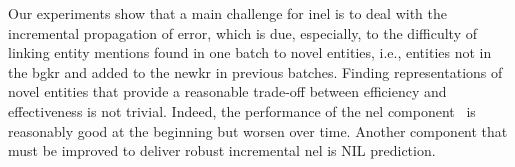 Our experiments show that a main challenge for \ac{inel} is to deal with the incremental propagation of error, which is due, especially, to the difficulty of linking entity mentions found in one batch to novel entities, i.e., entities not in the \ac{bgkr} and added to the \ac{newkr} in previous batches. 
Finding representations of novel entities that provide a reasonable trade-off between efficiency and effectiveness is not trivial.
Indeed, the performance of the \ac{nel} component~\cite{blink} is reasonably good at the beginning but worsen over time. Another component that must be improved to deliver robust incremental \ac{nel} is NIL prediction.      


